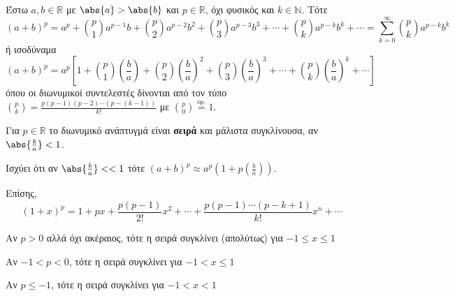 Έστω $ a,b \in \mathbb{R} $ με $ \abs{a} > \abs{b} $ και $ p \in \mathbb{R} $, όχι
φυσικός και $ k \in \mathbb{N} $. Τότε
\[
  \boxed{(a+b)^{p} = a^{p} + \binom{p}{1} a^{p-1}b + \binom{p}{2} a^{p-2}b^{2} +
    \binom{p}{3} a^{p-3}b^{3} + \cdots + \binom{p}{k} a^{p-k}b^{k} + \cdots =
  \sum_{k=0}^{\infty} \binom{p}{k} a^{p-k}b^{k}}
\] 
ή ισοδύναμα
\[
  (a+b)^{p} = a^{p}\left[1 + \binom{p}{1} \left(\frac{b}{a}\right)+ \binom{p}{2} 
    \left(\frac{b}{a}\right)^{2}+ \binom{p}{3} \left(\frac{b}{ a}\right)^{3}+ \cdots + 
  \binom{p}{k} \left(\frac{b}{a}\right)^{k}+ \cdots\right]
\] 
όπου οι διωνυμικοί συντελεστές δίνονται από τον τύπο
$
\binom{p}{k} = \frac{p(p-1)(p-2)\cdots (p-(k-1))}{k!} 
$ με $ \binom{p}{0} \overset{\text{ορ.}}{=} 1 $.
\begin{rem}
\item {}
  Για $ p \in \mathbb{R} $ το διωνυμικό ανάπτυγμά είναι \textbf{σειρά}
  και μάλιστα συγκλίνουσα, αν $ \abs{\frac{b}{a}} < 1 $. 

  Ισχύει ότι αν $ \abs{\frac{b}{a}} < < 1  $ τότε  
  $ (a+b)^{p} \approx a^{p}\left(1+p\left(\frac{b}{a}\right)\right)  $. 
\end{rem}
Επίσης,
\[
  \boxed{(1+x)^p = 1 + px + \frac{p(p-1)}{2!} x^2 + \cdots + \frac{p(p-1)\cdots
  (p-k+1)}{k!} x^n + \cdots}   
\] 
\begin{rem}
\item {}
  \begin{myitemize}
    \item Αν $ p>0 $ αλλά όχι ακέραιος, τότε η σειρά συγκλίνει (απολύτως) για $ -1 \leq x
      \leq 1 $
    \item Αν $-1<p<0$, τότε η σειρά συγκλίνει για $ -1 < x \leq 1 $
    \item Αν $p \leq -1$, τότε η σειρά συγκλίνει για $ -1 < x < 1 $
  \end{myitemize}
\end{rem}




